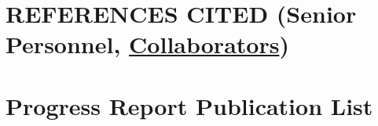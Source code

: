 








\clearpage
\section*{\normalsize{REFERENCES CITED \textnormal{(\textbf{Senior Personnel}, \underline{Collaborators})}}}




\section*{Progress Report Publication List}

\renewal

